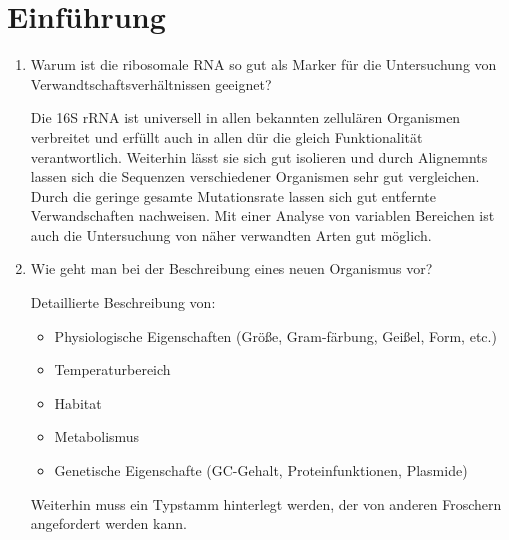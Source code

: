 
\section{Einführung}
\begin{enumerate}
\item Warum ist die ribosomale RNA so gut als Marker für die Untersuchung von Verwandtschaftsverhältnissen geeignet?
	
	Die 16S rRNA ist universell in allen bekannten zellulären Organismen verbreitet
	und erfüllt auch in allen dür die gleich Funktionalität verantwortlich.
	Weiterhin lässt sie sich gut isolieren
	und durch Alignemnts lassen sich die Sequenzen verschiedener Organismen sehr gut vergleichen.
	Durch die geringe gesamte Mutationsrate lassen sich gut entfernte Verwandschaften nachweisen.
	Mit einer Analyse von variablen Bereichen ist auch die Untersuchung von näher verwandten Arten gut möglich.

\item Wie geht man bei der Beschreibung eines neuen Organismus vor?
	
	Detaillierte Beschreibung von:
	\begin{itemize}
		\item Physiologische Eigenschaften (Größe, Gram-färbung, Geißel, Form, etc.)
		\item Temperaturbereich
		\item Habitat
		\item Metabolismus
		\item Genetische Eigenschafte (GC-Gehalt, Proteinfunktionen, Plasmide)
	\end{itemize}

	Weiterhin muss ein Typstamm hinterlegt werden,
	der von anderen Froschern angefordert werden kann.

\end{enumerate}

\newpage
